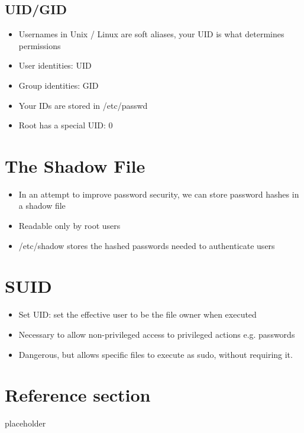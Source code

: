 \documentclass{article}
\begin{document}
\subsection{UID/GID}
\begin{itemize}
  \item Usernames in Unix / Linux are soft aliases, your UID is what determines permissions 
  \item User identities: UID 
  \item Group identities: GID 
  \item Your IDs are stored in /etc/passwd 
  \item Root has a special UID: 0
\end{itemize}

\section{The Shadow File}
\begin{itemize}
  \item In an attempt to improve password security, we can store password hashes in a shadow file 
  \item Readable only by root users 
  \item /etc/shadow stores the hashed passwords needed to authenticate users
\end{itemize}

\section{SUID}
\begin{itemize}
  \item Set UID: set the effective user to be the file owner when executed 
  \item Necessary to allow non-privileged access to privileged actions e.g. passwords 
  \item Dangerous, but allows specific files to execute as sudo, without requiring it.
\end{itemize}

\pagebreak
\section*{Reference section} \label{sec:reference}
\begin{description}
	\item[placeholder] \hfill \\
\end{description}
\end{document}

